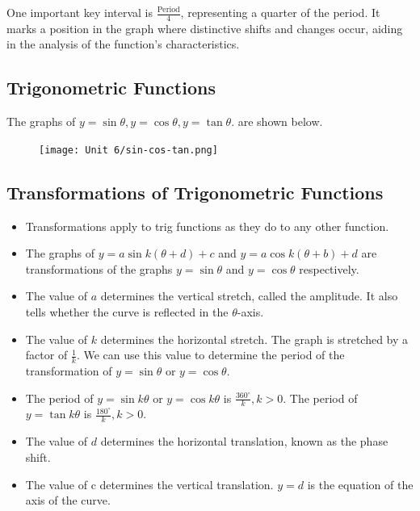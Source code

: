 \documentclass[12pt,a4paper]{article}
\begin{document}
One important key interval is $\frac{\text{Period}}{4}$, representing a quarter of the period. It marks a position in the graph where distinctive shifts and changes occur, aiding in the analysis of the function's characteristics.

\subsection{Trigonometric Functions}
The graphs of $y=\sin\theta, y=\cos\theta, y=\tan\theta.$ are shown below.
\begin{figure}[h]
    \centering
    \texttt{[image: Unit 6/sin-cos-tan.png]}
\end{figure}
\subsection{Transformations of Trigonometric Functions}
\begin{itemize}
    \item Transformations apply to trig functions as they do to any other function.
    \item The graphs of $y=a \sin k(\theta+d)+c$ and $y=a \cos k(\theta+b)+d$ are transformations of the graphs $y=\sin \theta$ and $y=\cos \theta$ respectively.
    \item The value of $a$ determines the vertical stretch, called the amplitude. It also tells whether the curve is reflected in the $\theta$-axis.
    \item The value of $k$ determines the horizontal stretch. The graph is stretched by a factor of $\frac{1}{k}$. We can use this value to determine the period of the transformation of $y=\sin \theta$ or $y=\cos \theta$.
    \item The period of $y=\sin k \theta$ or $y=\cos k \theta$ is $\frac{360^{\circ}}{k}, k>0$. The period of $y=\tan k \theta$ is $\frac{180^{\circ}}{k}, k>0$.
    \item The value of $d$ determines the horizontal translation, known as the phase shift.
    \item The value of $\mathrm{c}$ determines the vertical translation. $y=d$ is the equation of the axis of the curve.
\end{itemize}
\end{document}

